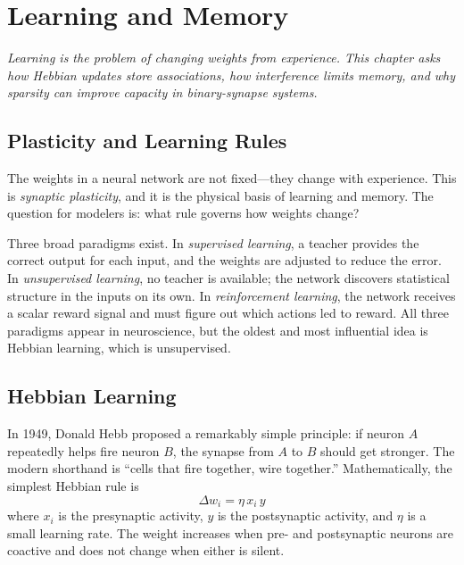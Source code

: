 \chapter{Learning and Memory}
\label{ch:learning}

\textit{Learning is the problem of changing weights from experience. This chapter asks how Hebbian updates store associations, how interference limits memory, and why sparsity can improve capacity in binary-synapse systems.}

\section{Plasticity and Learning Rules}
\label{sec:plasticity}

The weights in a neural network are not fixed---they change with experience. This is \emph{synaptic plasticity}, and it is the physical basis of learning and memory. The question for modelers is: what rule governs how weights change?

Three broad paradigms exist. In \emph{supervised learning}, a teacher provides the correct output for each input, and the weights are adjusted to reduce the error. In \emph{unsupervised learning}, no teacher is available; the network discovers statistical structure in the inputs on its own. In \emph{reinforcement learning}, the network receives a scalar reward signal and must figure out which actions led to reward. All three paradigms appear in neuroscience, but the oldest and most influential idea is Hebbian learning, which is unsupervised.

\section{Hebbian Learning}
\label{sec:hebbian}

In 1949, Donald Hebb proposed a remarkably simple principle: if neuron $A$ repeatedly helps fire neuron $B$, the synapse from $A$ to $B$ should get stronger. The modern shorthand is ``cells that fire together, wire together.'' Mathematically, the simplest Hebbian rule is
%
\begin{equation}
  \Delta w_i = \eta\, x_i\, y
  \label{eq:hebb}
\end{equation}
%
where $x_i$ is the presynaptic activity, $y$ is the postsynaptic activity, and $\eta$ is a small learning rate. The weight increases when pre- and postsynaptic neurons are coactive and does not change when either is silent.

